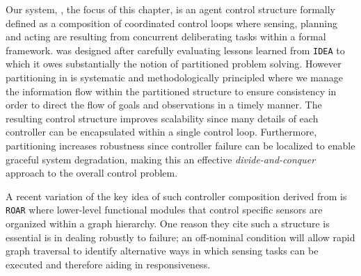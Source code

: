 Our system, \rxe, the focus of this chapter, is an agent control
structure formally defined as a composition of coordinated control
loops where sensing, planning and acting are resulting from concurrent
deliberating tasks within a formal framework.  \rx was designed after
carefully evaluating lessons learned from \texttt{IDEA} to which it
owes substantially the notion of partitioned problem solving. However
partitioning in \rx is systematic and methodologically principled
where we manage the information flow within the partitioned structure
to ensure consistency in order to direct the flow of goals and
observations in a timely manner. The resulting control structure
improves scalability since many details of each controller can be
encapsulated within a single control loop.  Furthermore, partitioning
increases robustness since controller failure can be localized to
enable graceful system degradation, making this an effective
\emph{divide-and-conquer} approach to the overall control problem.

A recent variation of the key idea of such controller composition
derived from \rx is \texttt{ROAR} \cite{degroote11} where lower-level
functional modules that control specific sensors are organized within
a graph hierarchy. One reason they cite such a structure is essential
is in dealing robustly to failure; an off-nominal condition will allow
rapid graph traversal to identify alternative ways in which sensing
tasks can be executed and therefore aiding in responsiveness. %


